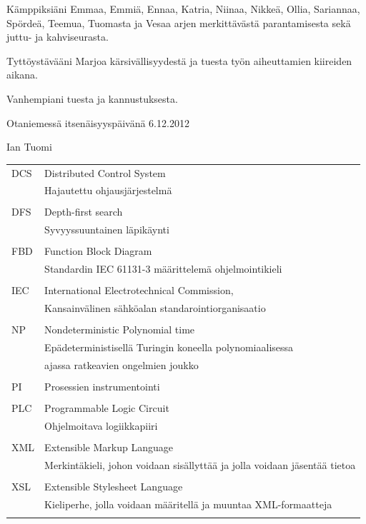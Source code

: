 \documentclass[finnish,12pt]{article}
\begin{document}
Kämppiksiäni Emmaa, Emmiä, Ennaa, Katria, Niinaa, Nikkeä, Ollia, Sariannaa, Spördeä, Teemua, Tuomasta ja Vesaa arjen merkittävästä parantamisesta sekä juttu- ja kahviseurasta.

Tyttöystävääni Marjoa kärsivällisyydestä ja tuesta työn aiheuttamien kiireiden aikana.

Vanhempiani tuesta ja kannustuksesta.

	\vspace{5cm}

Otaniemessä itsenäisyyspäivänä 6.12.2012

\vspace{1mm}
	{\hfill Ian Tuomi \hspace{1cm}}

	\newpage

	\tableofcontents




	\begin{tabular}{ll}	     	    
DCS	& Distributed Control System \\
	& Hajautettu ohjausjärjestelmä \\ \\
DFS	& Depth-first search\\
	& Syvyyssuuntainen läpikäynti \\\\

FBD	& Function Block Diagram\\
	& Standardin IEC 61131-3 määrittelemä ohjelmointikieli\\\\
IEC	& International Electrotechnical Commission,\\
	& Kansainvälinen sähköalan standarointiorganisaatio\\\\
NP & Nondeterministic Polynomial time\\
	& Epädeterministisellä Turingin koneella polynomiaalisessa\\&ajassa ratkeavien ongelmien joukko \\\\ 
PI	& Prosessien instrumentointi\\\\
PLC	& Programmable Logic Circuit \\
	& Ohjelmoitava logiikkapiiri\\\\
XML	& Extensible Markup Language\\
	& Merkintäkieli, johon voidaan sisällyttää ja jolla voidaan jäsentää tietoa  \\\\
XSL	& Extensible Stylesheet Language\\
	& Kieliperhe, jolla voidaan määritellä ja muuntaa XML-formaatteja\\\\


\end{tabular}
\end{document}
